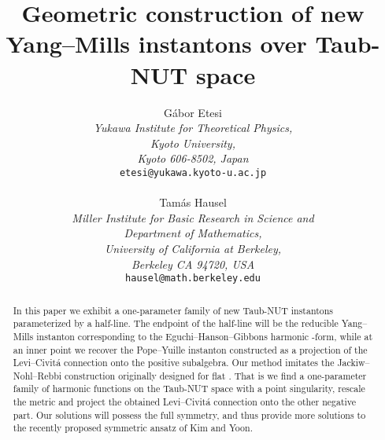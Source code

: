 \documentclass[a4paper,12pt,draft]{article}
\begin{document}
 

\title{Geometric construction of new Yang--Mills instantons over Taub-NUT 
space} 

\author{
G\'abor Etesi
\\ {\it Yukawa Institute for Theoretical Physics,}
\\ {\it  Kyoto University,}
\\{\it Kyoto 606-8502, Japan}
\\ {\tt etesi@yukawa.kyoto-u.ac.jp}
\\
\\ Tam\'as Hausel
\\ {\it Miller Institute for Basic Research in Science and}\\
{\it Department of Mathematics,}
\\ {\it University of California at Berkeley,}
\\ {\it Berkeley CA 94720, USA}\\
{\tt hausel@math.berkeley.edu} }

\maketitle

\pagestyle{myheadings}

\thispagestyle{empty}

\begin{abstract}
In this paper we exhibit a one-parameter family of new Taub-NUT instantons
parameterized by a half-line.  The endpoint of the
half-line will be the reducible Yang--Mills instanton corresponding to the
Eguchi--Hanson--Gibbons \coordHE{} harmonic
\coordHE{}-form, while at an inner point we recover the Pope--Yuille 
instanton constructed as a projection of the Levi--Civit\'a
connection onto the positive \myHighlight{$\su^+\subset \so$}\coordHE{} subalgebra. Our method
imitates the Jackiw--Nohl--Rebbi construction originally designed for
flat \coordHE{}. That is we find a one-parameter family of harmonic functions
on the Taub-NUT space with a point singularity, rescale the metric and
project the obtained Levi--Civit\'a connection onto the other negative
\myHighlight{$\su^-\subset\so$}\coordHE{} part. Our solutions will possess the full \coordHE{}
symmetry, and thus provide more solutions to the recently proposed \coordHE{}
symmetric ansatz of Kim and Yoon. 

\end{abstract}
\end{document}
